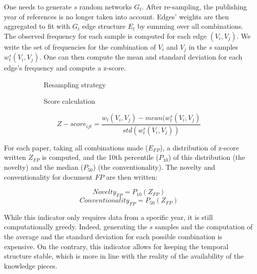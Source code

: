 One needs to generate $s$ random networks $G_{t}$. After re-sampling, the publishing year of references is no longer taken into account. Edges' weights are then aggregated to fit with $G_t$ edge structure $E_t$ by summing over all combinations. The observed frequency for each sample is computed for each edge $(V_i, V_j)$. We write the set of frequencies for the combination of $V_i$ and $V_j$ in the $s$ samples $w_t^s({V_i, V_j})$. One can then compute the mean and standard deviation for each edge's frequency and compute a z-score.

\begin{figure}
\centering
\begin{subfigure}{.5\textwidth}
  \centering
  
  \caption{Resampling strategy}
\end{subfigure}%
\begin{subfigure}{.5\textwidth}
  \centering
  
  \caption{Score calculation}
\end{subfigure}
\caption[\cite{uzzi2013atypical}] {\cite{uzzi2013atypical} \footnotemark}
\label{fig:2}
\end{figure} 


$$Z-score_{ijt}=\frac{w_t({V_i,V_j})-mean(w_t^s({V_i,V_j})}{std(w_t^s({V_i,V_j}))}$$ 

For each paper, taking all combinations made ($E_{FP}$), a distribution of z-score written $Z_{FP}$ is computed, and the 10th percentile ($P_{10}$) of this distribution (the novelty) and the median ($P_{50}$) (the conventionality). The novelty and conventionality for document $FP$ are then written:


$$Novelty_{FP} = P_{10}(Z_{FP})$$
$$Conventionality_{FP} = P_{50}(Z_{FP})$$

While this indicator only requires data from a specific year, it is still computationally greedy. Indeed, generating the $s$ samples and the computation of the average and the standard deviation for each possible combination is expensive. On the contrary, this indicator allows for keeping the temporal structure stable, which is more in line with the reality of the availability of the knowledge pieces.

